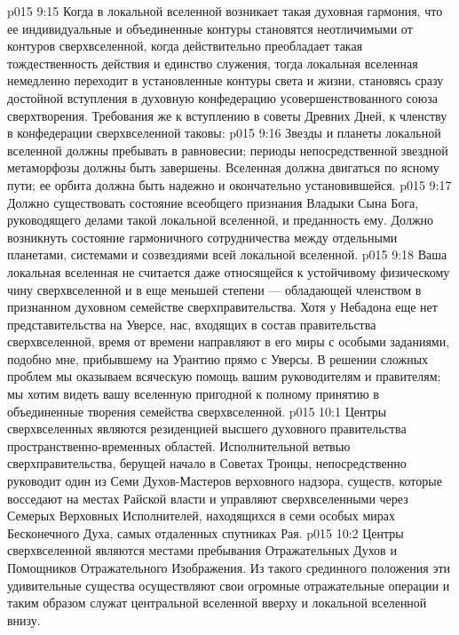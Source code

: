 \vs p015 9:15 \pc Когда в локальной вселенной возникает такая духовная гармония, что ее индивидуальные и объединенные контуры становятся неотличимыми от контуров сверхвселенной, когда действительно преобладает такая тождественность действия и единство служения, тогда локальная вселенная немедленно переходит в установленные контуры света и жизни, становясь сразу достойной вступления в духовную конфедерацию усовершенствованного союза сверхтворения. Требования же к вступлению в советы Древних Дней, к членству в конфедерации сверхвселенной таковы:
\vs p015 9:16 \bibnobreakspace {} Звезды и планеты локальной вселенной должны пребывать в равновесии; периоды непосредственной звездной метаморфозы должны быть завершены. Вселенная должна двигаться по ясному пути; ее орбита должна быть надежно и окончательно установившейся.
\vs p015 9:17 \pc {}\bibnobreakspace {} Должно существовать состояние всеобщего признания Владыки Сына Бога, руководящего делами такой локальной вселенной, и преданность ему. Должно возникнуть состояние гармоничного сотрудничества между отдельными планетами, системами и созвездиями всей локальной вселенной.
\vs p015 9:18 \pc Ваша локальная вселенная не считается даже относящейся к устойчивому физическому чину сверхвселенной и в еще меньшей степени --- обладающей членством в признанном духовном семействе сверхправительства. Хотя у Небадона еще нет представительства на Уверсе, нас, входящих в состав правительства сверхвселенной, время от времени направляют в его миры с особыми заданиями, подобно мне, прибывшему на Урантию прямо с Уверсы. В решении сложных проблем мы оказываем всяческую помощь вашим руководителям и правителям; мы хотим видеть вашу вселенную пригодной к полному принятию в объединенные творения семейства сверхвселенной.
\vs p015 10:1 Центры сверхвселенных являются резиденцией высшего духовного правительства пространственно\hyp{}временных областей. Исполнительной ветвью сверхправительства, берущей начало в Советах Троицы, непосредственно руководит один из Семи Духов\hyp{}Мастеров верховного надзора, существ, которые восседают на местах Райской власти и управляют сверхвселенными через Семерых Верховных Исполнителей, находящихся в семи особых мирах Бесконечного Духа, самых отдаленных спутниках Рая.
\vs p015 10:2 Центры сверхвселенной являются местами пребывания Отражательных Духов и Помощников Отражательного Изображения. Из такого срединного положения эти удивительные существа осуществляют свои огромные отражательные операции и таким образом служат центральной вселенной вверху и локальной вселенной внизу.
